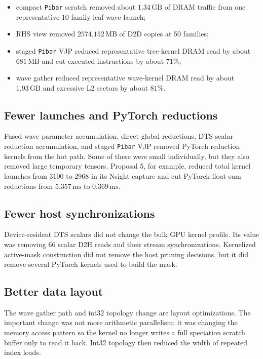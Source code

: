 \documentclass[11pt]{article}
\newcommand{\ms}{\,\mathrm{ms}}
\newcommand{\gb}{\,\mathrm{GB}}
\newcommand{\mb}{\,\mathrm{MB}}
\newcommand{\code}[1]{\texttt{#1}}
\begin{document}
\begin{itemize}[leftmargin=*]
\item compact \code{Pibar} scratch removed about $1.34\gb$ of DRAM traffic from
      one representative 10-family leaf-wave launch;
\item RHS view removed $2574.152\mb$ of D2D copies at 50 families;
\item staged \code{Pibar} VJP reduced representative tree-kernel DRAM read by
      about $681\mb$ and cut executed instructions by about $71\%$;
\item wave gather reduced representative wave-kernel DRAM read by about
      $1.93\gb$ and excessive L2 sectors by about $81\%$.
\end{itemize}

\subsection{Fewer launches and PyTorch reductions}

Fused wave parameter accumulation, direct global reductions, DTS scalar
reduction accumulation, and staged \code{Pibar} VJP removed PyTorch reduction
kernels from the hot path.  Some of these were small individually, but they
also removed large temporary tensors.  Proposal 5, for example, reduced total
kernel launches from 3100 to 2968 in its Nsight capture and cut PyTorch
float-sum reductions from $5.357\ms$ to $0.369\ms$.

\subsection{Fewer host synchronizations}

Device-resident DTS scalars did not change the bulk GPU kernel profile.  Its
value was removing 66 scalar D2H reads and their stream synchronizations.
Kernelized active-mask construction did not remove the host pruning decisions,
but it did remove several PyTorch kernels used to build the mask.

\subsection{Better data layout}

The wave gather path and int32 topology change are layout optimizations.  The
important change was not more arithmetic parallelism; it was changing the
memory access pattern so the kernel no longer writes a full speciation scratch
buffer only to read it back.  Int32 topology then reduced the width of repeated
index loads.
\end{document}
